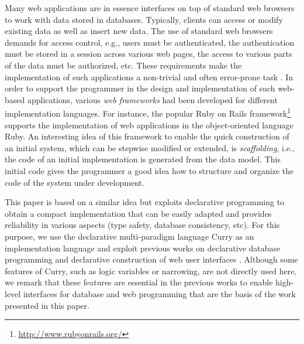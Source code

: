 \documentclass{tlp}
\renewcommand{\tt}{\usefont{OT1}{cmtt}{m}{n}\selectfont}
\begin{document}
Many web applications are in essence interfaces
on top of standard web browsers to work with data
stored in databases.
Typically, clients can access or modify existing data
as well as insert new data. The use of standard web browsers
demands for access control,
e.g., users must be authenticated, the authentication must be stored in
a session across various web pages, the access to various parts of the data
must be authorized, etc.
These requirements make the implementation of such applications
a non-trivial and often error-prone task \cite{Huseby03}.
In order to support the programmer in the design and implementation
of such web-based applications, various \emph{web frameworks}
had been developed for different implementation languages.
For instance, the popular Ruby on Rails
framework\footnote{\tt\url{http://www.rubyonrails.org/}}
supports the implementation of web applications in the
object-oriented language Ruby.
An interesting idea of this framework to enable the quick construction
of an initial system, which can be stepwise modified or extended,
is \emph{scaffolding}, i.e., the code of an initial implementation
is generated from the data model.
This initial code gives the programmer a good idea how to
structure and organize the code of the system under development.

This paper is based on a similar idea but exploits declarative
programming to obtain a compact implementation that can be easily
adapted and provides reliability in various aspects
(type safety, database consistency, etc).
For this purpose, we use the declarative multi-paradigm language
Curry \cite{Hanus97POPL,Hanus12Curry}
as an implementation language and exploit previous works
on declarative database programming \cite{BrasselHanusMueller08PADL}
and declarative construction of web user interfaces
\cite{Hanus06PPDP,Hanus07PPDP}.
Although some features of Curry, such as logic variables or narrowing,
are not directly used here, we remark that these features
are essential in the previous works to enable high-level
interfaces for database and web programming that are the basis
of the work presented in this paper.
\end{document}
